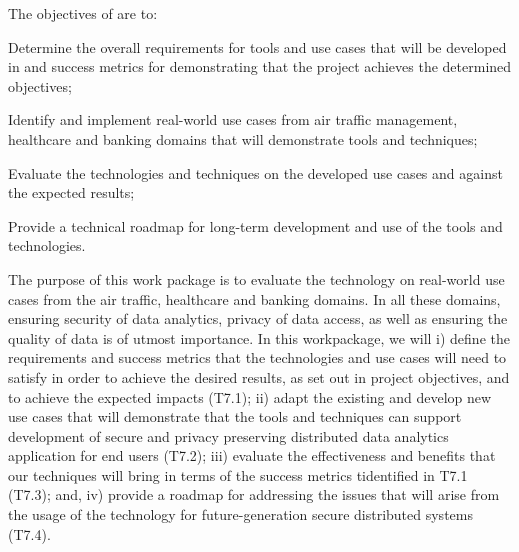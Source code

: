 \addtocounter{wpno}{1}
\begin{Workpackage}{\thewpno}
\WPTitle{\wpname{\thewpno}}



\begin{WPObjectives}
The objectives of \theWP{} are to:
\begin{compactitem}
\item	Determine the overall requirements for tools and use cases that will be developed in \TheProject{} and success metrics for demonstrating that the project achieves the determined objectives;
\item	Identify and implement real-world use cases from air traffic management, healthcare and banking domains that will demonstrate \TheProject{} tools and techniques;
\item	Evaluate the \TheProject{} technologies and techniques on the developed use cases and against the expected results;
\item	Provide a technical roadmap for long-term development and use of the \TheProject tools and technologies.
\end{compactitem}
\end{WPObjectives}

\begin{WPDescription}
The purpose of this work package is to evaluate the \TheProject technology on real-world use cases from the air traffic, healthcare and banking domains. In all these domains, ensuring security of data analytics, privacy of data access, as well as ensuring the quality of data is of utmost importance. In this workpackage, we will i) define the requirements and success metrics that the \TheProject{} technologies and use cases will need to satisfy in order to achieve the desired results, as set out in project objectives, and to achieve the expected impacts (T7.1); ii) adapt the existing and develop new use cases that will demonstrate that the \TheProject{} tools and techniques can support development of secure and privacy preserving distributed data analytics application for end users (T7.2); iii)  evaluate the effectiveness and benefits that our techniques will bring in terms of the success metrics tidentified in T7.1 (T7.3); and, iv) provide a roadmap for addressing the issues that will arise from the usage of the \TheProject{} technology for future-generation
secure distributed systems (T7.4).
\end{WPDescription}


\end{Workpackage}
